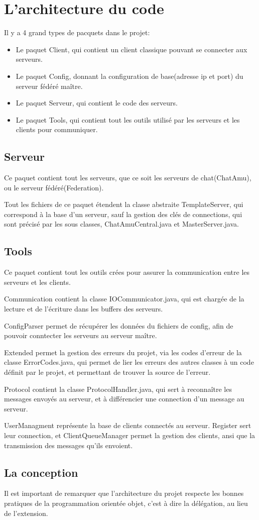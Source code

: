 \section{L'architecture du code}
Il y a 4 grand types de pacquets dans le projet:
\begin{itemize}
    \item Le paquet Client, qui contient un client classique pouvant se connecter aux serveurs.
    \item Le paquet Config, donnant la configuration de base(adresse ip et port) du serveur fédéré maître.
    \item Le paquet Serveur, qui contient le code des serveurs.
    \item Le paquet Tools, qui contient tout les outils utilisé par les serveurs et les clients pour communiquer.
\end{itemize}

\subsection{Serveur}
Ce paquet contient tout les serveurs, que ce soit les serveurs de chat(ChatAmu), ou le serveur fédéré(Federation).

Tout les fichiers de ce paquet étendent la classe abstraite TemplateServer, qui correspond à la base d'un serveur, sauf la gestion des clés de connections, qui sont précisé par les sous classes, ChatAmuCentral.java et MasterServer.java.

\subsection{Tools}
Ce paquet contient tout les outils crées pour assurer la communication entre les serveurs et les clients.

Communication contient la classe IOCommunicator.java, qui est chargée de la lecture et de l'écriture dans les buffers des serveurs.

ConfigParser permet de récupérer les données du fichiers de config, afin de pouvoir conntecter les serveurs au serveur maître.

Extended permet la gestion des erreurs du projet, via les codes d'erreur de la classe ErrorCodes.java, qui permet de lier les erreurs des autres classes à un code définit par le projet, et permettant de trouver la source de l'erreur.

Protocol contient la classe ProtocolHandler.java, qui sert à reconnaître les messages envoyés au serveur, et à différencier une connection d'un message au serveur.

UserManagment représente la base de clients connectés au serveur. Register sert  leur connection, et ClientQueueManager permet la gestion des clients, ansi que la transmission des messages qu'ils envoient.

\subsection{La conception}
Il est important de remarquer que l'architecture du projet respecte les bonnes pratiques de la programmation orientée objet, c'est à dire la délégation, au lieu de l'extension.
